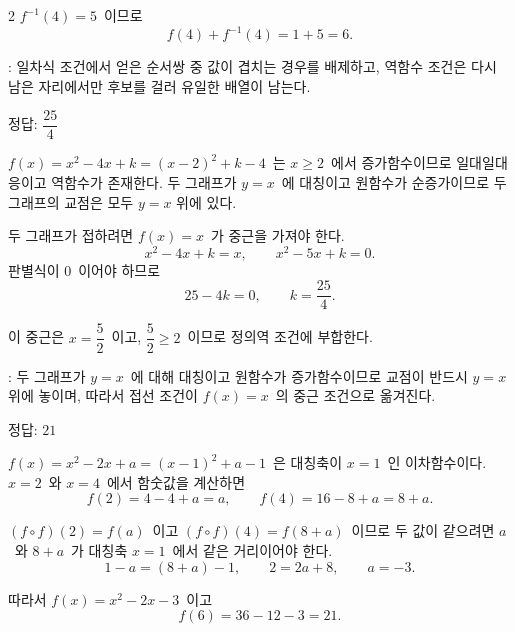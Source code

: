 \documentclass[10pt,fleqn]{article}
\begin{document}
\begin{multicols*}{2}
$f^{-1}(4) = 5$\ 이므로
\[ f(4) + f^{-1}(4) = 1 + 5 = 6. \]

\begin{dmcriticalpoint}
: 일차식 조건에서 얻은 순서쌍 중 값이 겹치는 경우를 배제하고, 역함수 조건은 다시 남은 자리에서만 후보를 걸러 유일한 배열이 남는다.
\end{dmcriticalpoint}

\begin{dmanswerbox}
정답: $\dfrac{25}{4}$
\end{dmanswerbox}

$f(x) = x^{2} - 4x + k = (x - 2)^{2} + k - 4$\ 는 $x \ge 2$\ 에서 증가함수이므로 일대일대응이고 역함수가 존재한다. 두 그래프가 $y = x$\ 에 대칭이고 원함수가 순증가이므로 두 그래프의 교점은 모두 $y = x$ 위에 있다.

두 그래프가 접하려면 $f(x) = x$\ 가 중근을 가져야 한다.
\[ x^{2} - 4x + k = x,\qquad x^{2} - 5x + k = 0. \]
판별식이 $0$\ 이어야 하므로
\[ 25 - 4k = 0,\qquad k = \dfrac{25}{4}. \]

이 중근은 $x = \dfrac{5}{2}$\ 이고, $\dfrac{5}{2} \ge 2$\ 이므로 정의역 조건에 부합한다.

\begin{dmcriticalpoint}
: 두 그래프가 $y=x$\ 에 대해 대칭이고 원함수가 증가함수이므로 교점이 반드시 $y=x$ 위에 놓이며, 따라서 접선 조건이 $f(x)=x$\ 의 중근 조건으로 옮겨진다.
\end{dmcriticalpoint}

\begin{dmanswerbox}
정답: $21$
\end{dmanswerbox}

$f(x) = x^{2} - 2x + a = (x - 1)^{2} + a - 1$\ 은 대칭축이 $x = 1$\ 인 이차함수이다. $x = 2$\ 와 $x = 4$\ 에서 함숫값을 계산하면
\[ f(2) = 4 - 4 + a = a,\qquad f(4) = 16 - 8 + a = 8 + a. \]

$(f \circ f)(2) = f(a)$\ 이고 $(f \circ f)(4) = f(8 + a)$\ 이므로 두 값이 같으려면 $a$\ 와 $8 + a$\ 가 대칭축 $x = 1$\ 에서 같은 거리이어야 한다.
\[ 1 - a = (8 + a) - 1,\qquad 2 = 2a + 8,\qquad a = -3. \]

따라서 $f(x) = x^{2} - 2x - 3$\ 이고
\[ f(6) = 36 - 12 - 3 = 21. \]
\end{multicols*}

\end{document}
